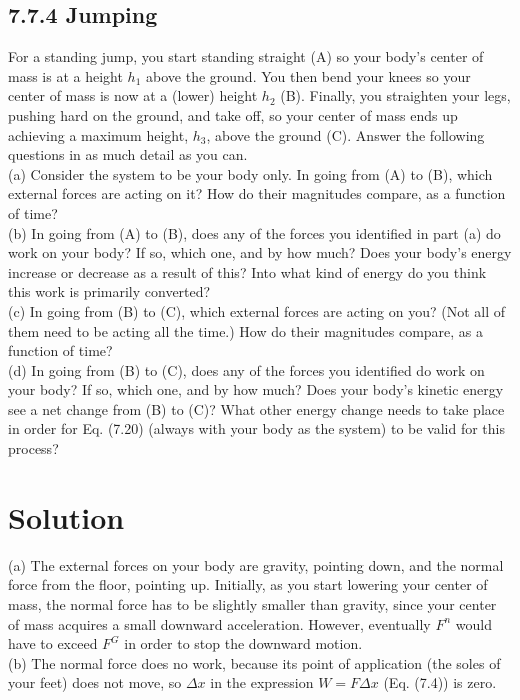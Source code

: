 \documentclass[10pt]{article}
\begin{document}
\subsection*{7.7.4 Jumping}
For a standing jump, you start standing straight (A) so your body's center of mass is at a height $h_{1}$ above the ground. You then bend your knees so your center of mass is now at a (lower) height $h_{2}$ (B). Finally, you straighten your legs, pushing hard on the ground, and take off, so your center of mass ends up achieving a maximum height, $h_{3}$, above the ground (C). Answer the following questions in as much detail as you can.\\
(a) Consider the system to be your body only. In going from (A) to (B), which external forces are acting on it? How do their magnitudes compare, as a function of time?\\
(b) In going from (A) to (B), does any of the forces you identified in part (a) do work on your body? If so, which one, and by how much? Does your body's energy increase or decrease as a result of this? Into what kind of energy do you think this work is primarily converted?\\
(c) In going from (B) to (C), which external forces are acting on you? (Not all of them need to be acting all the time.) How do their magnitudes compare, as a function of time?\\
(d) In going from (B) to (C), does any of the forces you identified do work on your body? If so, which one, and by how much? Does your body's kinetic energy see a net change from (B) to (C)? What other energy change needs to take place in order for Eq. (7.20) (always with your body as the system) to be valid for this process?

\section*{Solution}
(a) The external forces on your body are gravity, pointing down, and the normal force from the floor, pointing up. Initially, as you start lowering your center of mass, the normal force has to be slightly smaller than gravity, since your center of mass acquires a small downward acceleration. However, eventually $F^{n}$ would have to exceed $F^{G}$ in order to stop the downward motion.\\
(b) The normal force does no work, because its point of application (the soles of your feet) does not move, so $\Delta x$ in the expression $W=F \Delta x$ (Eq. (7.4)) is zero.
\end{document}

